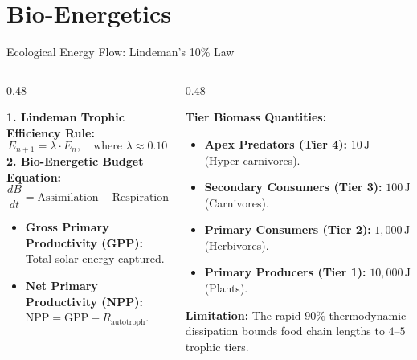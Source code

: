 \documentclass[aspectratio=169, 9pt]{beamer}
\begin{document}
\section{Bio-Energetics}
\begin{frame}{Ecological Energy Flow: Lindeman's 10\% Law}
    \begin{columns}[t]
        \begin{column}{0.48\textwidth}
            \par\vspace{0.2em}
            \scriptsize
            \textbf{1. Lindeman Trophic Efficiency Rule:}
            \begin{equation*}
                E_{n+1} = \lambda \cdot E_n, \quad \text{where } \lambda \approx 0.10
            \end{equation*}
            \vspace{0.1em}
            \textbf{2. Bio-Energetic Budget Equation:}
            \begin{equation*}
                \frac{dB}{dt} = \text{Assimilation} - \text{Respiration} - \text{Excretion}
            \end{equation*}
            \begin{itemize}\setlength{\itemsep}{1.5pt}
                \item \textbf{Gross Primary Productivity (GPP):} Total solar energy captured.
                \item \textbf{Net Primary Productivity (NPP):} $\mathrm{NPP} = \mathrm{GPP} - R_{\mathrm{autotroph}}$.
            \end{itemize}
        \end{column}
        \begin{column}{0.48\textwidth}
            \par\vspace{0.2em}
            \scriptsize
            \textbf{Tier Biomass Quantities:}
            \begin{itemize}\setlength{\itemsep}{2pt}
                \item \textbf{Apex Predators (Tier 4):} $10\,\mathrm{J}$ (Hyper-carnivores).
                \item \textbf{Secondary Consumers (Tier 3):} $100\,\mathrm{J}$ (Carnivores).
                \item \textbf{Primary Consumers (Tier 2):} $1{,}000\,\mathrm{J}$ (Herbivores).
                \item \textbf{Primary Producers (Tier 1):} $10{,}000\,\mathrm{J}$ (Plants).
            \end{itemize}
            \vspace{0.2em}
            \begin{takeaway}
                \textbf{Limitation:} The rapid $90\%$ thermodynamic dissipation bounds food chain lengths to $4\text{--}5$ trophic tiers.
            \end{takeaway}
        \end{column}
    \end{columns}
\end{frame}
\end{document}
